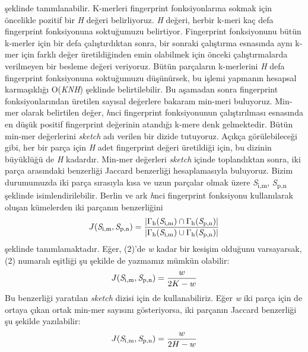 şeklinde tanımlanabilir. K-merleri fingerprint fonksiyonlarına sokmak için öncelikle pozitif bir \textit{H} değeri belirliyoruz. \textit{H} değeri, herbir k-meri kaç defa fingerprint fonksiyonuna soktuğumuzu belirtiyor. Fingerprint fonksiyonunu bütün k-merler için bir defa çalıştırdıktan sonra, bir sonraki çalıştırma esnasında aynı k-mer için farklı değer üretildiğinden emin olabilmek için önceki çalıştırmalarda verilmeyen bir besleme değeri veriyoruz. Bütün parçaların k-merlerini \textit{H} defa fingerprint fonksiyonuna soktuğumuzu düşünürsek, bu işlemi yapmanın hesapsal karmaşıklığı O(\textbar\textit{K}\textbar\textit{N}\textit{H}) şeklinde belirtilebilir. Bu aşamadan sonra fingerprint fonksiyonlarından üretilen sayısal değerlere bakaram min-meri buluyoruz. Min-mer olarak belirtilen değer, \textit{h}nci fingerprint fonksiyonunun çalıştırılması esnasında en düşük positif fingerprint değerinin atandığı k-mere denk gelmektedir. Bütün min-mer değerlerini \textit{sketch} adı verilen bir dizide tutuyoruz. Açıkça görülebileceği gibi, her bir parça için \textit{H} adet fingerprint değeri üretildiği için, bu dizinin büyüklüğü de \textit{H} kadardır. Min-mer değerleri \textit{sketch} içinde toplandıktan sonra, iki parça arasındaki benzerliği Jaccard benzerliği \cite{Jaccard1901} hesaplamasıyla buluyoruz. Bizim durumumuzda iki parça sırasıyla kısa ve uzun parçalar olmak üzere \textit{S}\textsubscript{i,m}, \textit{S}\textsubscript{p,n} şeklinde isimlendirilebilir. Berlin ve ark \textit{h}nci fingerprint fonksiyonu kullanılarak oluşan kümelerden iki parçanın benzerliğini
\begin{equation}
J(\textit{S}\textsubscript{i,m}, \textit{S}\textsubscript{p,n}) = \dfrac{|\Gamma \textsubscript{h}(\textit{S}\textsubscript{i,m}) \cap \Gamma \textsubscript{h}(\textit{S}\textsubscript{p,n})|}{|\Gamma \textsubscript{h}(\textit{S}\textsubscript{i,m}) \cup \Gamma \textsubscript{h}(\textit{S}\textsubscript{p,n})|}
\end{equation}
şeklinde tanımlamaktadır. Eğer, (2)'de \textit{w} kadar bir kesişim olduğunu varsayarsak, (2) numaralı eşitliği şu şekilde de yazmamız mümkün olabilir:
\begin{equation}
J(\textit{S}\textsubscript{i,m}, \textit{S}\textsubscript{p,n}) = \dfrac{w}{2K - w}
\end{equation}
Bu benzerliği yaratılan \textit{sketch} dizisi için de kullanabiliriz. Eğer \textit{w} iki parça için de ortaya çıkan ortak min-mer sayısını gösteriyorsa, iki parçanın Jaccard benzerliği şu şekilde yazılabilir:
\begin{equation}
J(\textit{S}\textsubscript{i,m}, \textit{S}\textsubscript{p,n}) = \dfrac{w}{2H - w}
\end{equation}

